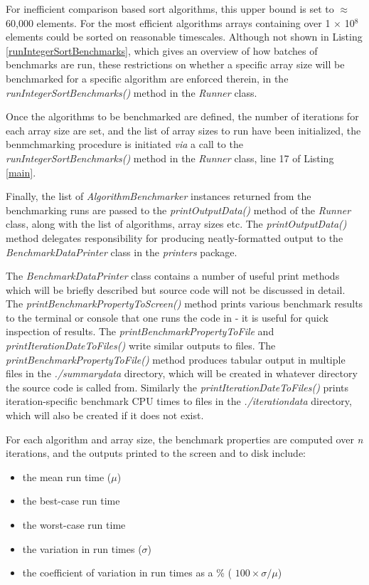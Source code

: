 \documentclass[12pt,a4paper]{article}
\begin{document}
For inefficient comparison based sort algorithms, this upper bound is set to $\approx$ 60,000 elements. For the most efficient algorithms arrays containing over 1 $\times$ 10${^8}$ elements could be sorted on reasonable timescales. Although not shown in Listing \ref{runIntegerSortBenchmarks}, which gives an overview of how batches of benchmarks are run, these restrictions on whether a specific array size will be benchmarked for a specific algorithm are enforced therein, in the \emph{runIntegerSortBenchmarks()} method in the \emph{Runner} class.

Once the algorithms to be benchmarked are defined, the number of iterations for each array size are set, and the list of array sizes to run have been initialized, the benmchmarking procedure is initiated \emph{via} a call to the \emph{runIntegerSortBenchmarks()} method in the \emph{Runner} class, line 17 of Listing \ref{main}.

Finally, the list of \emph{AlgorithmBenchmarker} instances returned from the benchmarking runs are passed to the \emph{printOutputData()} method of the \emph{Runner} class, along with the list of algorithms, array sizes etc. The \emph{printOutputData()} method delegates responsibility for producing neatly-formatted output to the \emph{BenchmarkDataPrinter} class in the \emph{printers} package.

The \emph{BenchmarkDataPrinter} class contains a number of useful print methods which will be briefly described but source code will not be discussed in detail. The \emph{printBenchmarkPropertyToScreen()} method prints various benchmark results to the terminal or console that one runs the code in - it is useful for quick inspection of results. The \emph{printBenchmarkPropertyToFile} and \emph{printIterationDateToFiles()} write similar outputs to files. The \emph{printBenchmarkPropertyToFile()} method produces tabular output in multiple files in the \emph{./summary\textunderscore data} directory, which will be created in whatever directory the source code is called from. Similarly the \emph{printIterationDateToFiles()} prints iteration-specific benchmark CPU times to files in the \emph{./iteration\textunderscore data} directory, which will also be created if it does not exist.

For each algorithm and array size, the benchmark properties are computed over \emph{n} iterations, and the outputs printed to the screen and to disk include:

\begin{itemize}
	\item the mean run time ($\mu$)
	\item the best-case run time
	\item the worst-case run time
	\item the variation in run times ($\sigma$)
	\item the coefficient of variation in run times as a \% ( $100\times \sigma / \mu$)

\end{itemize}
\end{document}
